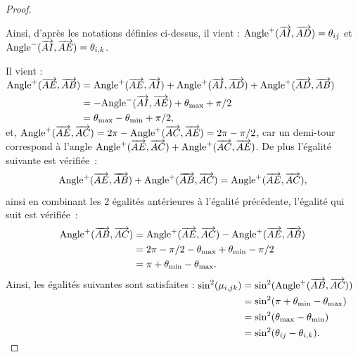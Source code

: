 \documentclass[12pt,a4paper]{article}
\begin{document}
\begin{proof}
\begin{center}
			\label{fig:angle}
		\end{center}
		Ainsi, d'après les notations définies ci-dessus, il vient : $\mathrm{Angle}^+(\overrightarrow{AI},\overrightarrow{AD}) = \theta_{ij}$ et $\mathrm{Angle}^-(\overrightarrow{AI},\overrightarrow{AE}) = \theta_{i,k}$.
		
		Il vient : $\begin{aligned}[t]
			\mathrm{Angle}^+(\overrightarrow{AE},\overrightarrow{AB}) &= \mathrm{Angle}^+(\overrightarrow{AE},\overrightarrow{AI}) + \mathrm{Angle}^+(\overrightarrow{AI},\overrightarrow{AD}) + \mathrm{Angle}^+(\overrightarrow{AD},\overrightarrow{AB})\\
			&= -\mathrm{Angle}^-(\overrightarrow{AI},\overrightarrow{AE}) + \theta_{\max} + \pi/2\\
			& = \theta_{\max}-\theta_{\min}+\pi/2,
		\end{aligned}$ \\		
		et, $\mathrm{Angle}^+(\overrightarrow{AE},\overrightarrow{AC}) = 2\pi-\mathrm{Angle}^+(\overrightarrow{AC},\overrightarrow{AE}) = 2\pi-\pi/2$, car un demi-tour correspond à l'angle $\mathrm{Angle}^+(\overrightarrow{AE},\overrightarrow{AC})+\mathrm{Angle}^+(\overrightarrow{AC},\overrightarrow{AE})$. De plus l'égalité suivante est vérifiée : 
		\[\mathrm{Angle}^+(\overrightarrow{AE},\overrightarrow{AB}) + \mathrm{Angle}^+(\overrightarrow{AB},\overrightarrow{AC}) = \mathrm{Angle}^+(\overrightarrow{AE},\overrightarrow{AC}),\]
		ainsi en combinant les 2 égalités antérieures à l'égalité précédente, l'égalité qui suit est vérifiée :\\
		\[\begin{aligned}[t]
			\mathrm{Angle}^+(\overrightarrow{AB},\overrightarrow{AC}) &= \mathrm{Angle}^+(\overrightarrow{AE},\overrightarrow{AC})-\mathrm{Angle}^+(\overrightarrow{AE},\overrightarrow{AB})\\
			& = 2\pi-\pi/2 - \theta_{\max}+\theta_{\min}-\pi/2\\
			& = \pi + \theta_{\min}-\theta_{\max}.
		\end{aligned}\]
		Ainsi, les égalités suivantes sont satisfaites : $\begin{aligned}[t]
			\sin^2(\mu_{i,jk}) &= \sin^2(\mathrm{Angle}^+(\overrightarrow{AB},\overrightarrow{AC}))\\
			& = \sin^2(\pi+\theta_{\min}-\theta_{\max})\\
			& = \sin^2(\theta_{\max}-\theta_{\min})\\
			& = \sin^2(\theta_{ij}-\theta_{i,k}).
		\end{aligned}$
		
		\vspace*{-1cm}
	\end{proof}
	
\end{document}
